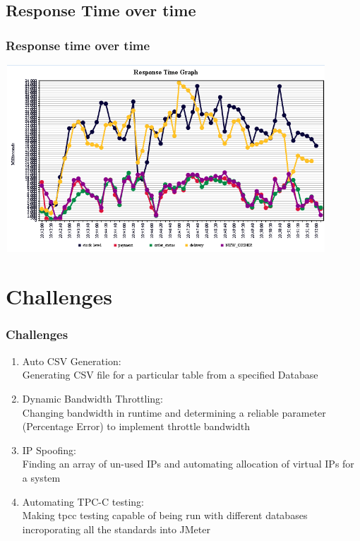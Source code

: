 \documentclass[12pt]{beamer}
\begin{document}
\subsection{Response Time over time}
\begin{frame}[c]
\frametitle{Response time over time}
\centering
   \includegraphics[width=12cm, height=7cm]{images/responsetime}

\end{frame}

\section{Challenges}
\begin{frame}[c]
\frametitle{Challenges}
\begin{enumerate}
\item<+-|alert@+> Auto CSV Generation:
\\Generating CSV file for a particular table from a specified Database
\item<+-|alert@+> Dynamic Bandwidth Throttling:
\\Changing bandwidth in runtime and determining a reliable parameter (Percentage Error) to implement throttle bandwidth
\item<+-|alert@+> IP Spoofing:
\\Finding an array of un-used IPs and automating allocation of virtual IPs for a system
\item<+-|alert@+> Automating TPC-C testing:
\\Making tpcc testing capable of being run with different databases
  incroporating all the standards into JMeter
\end{enumerate}
\end{frame}
\end{document}
